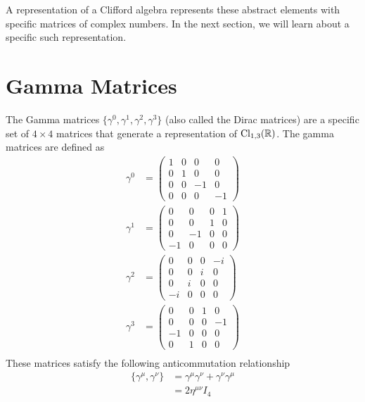 \documentclass[book.tex]{subfiles}
\begin{document}
A representation of a Clifford algebra represents these abstract elements with specific matrices of complex numbers. In the next section, we will learn about a specific such representation.

\section{Gamma Matrices}

The Gamma matrices $\{\gamma^0, \gamma^1, \gamma^2, \gamma^3\}$ (also called the Dirac matrices) are a specific set of $4 \times 4$ matrices that generate a representation of $\rm{Cl}_{1,3}(\mathbb{R})$. The gamma matrices are defined as
\begin{align}
    \gamma^0 &= \begin{pmatrix}
    1 & 0 & 0 & 0 \\
    0 & 1 & 0 & 0 \\
    0 & 0 & -1 & 0 \\
    0 & 0 & 0 & -1 
    \end{pmatrix} \\
    \gamma^1 &= \begin{pmatrix}
    0 & 0 & 0 & 1 \\
    0 & 0 & 1 & 0 \\
    0 & -1 & 0 & 0 \\
    -1 & 0 & 0 & 0 
    \end{pmatrix} \\
    \gamma^2 &= \begin{pmatrix}
    0 & 0 & 0 & -i \\
    0 & 0 & i & 0 \\
    0 & i & 0 & 0 \\
    -i & 0 & 0 & 0 
    \end{pmatrix} \\
    \gamma^3 &= \begin{pmatrix}
    0 & 0 & 1 & 0 \\
    0 & 0 & 0 & -1 \\
    -1 & 0 & 0 & 0 \\
    0 & 1 & 0 & 0 
    \end{pmatrix} \\
\end{align}
These matrices satisfy the following anticommutation relationship
\begin{align}
    \{\gamma^\mu, \gamma^\nu\} &= \gamma^{\mu} \gamma^\nu + \gamma^\nu \gamma^\mu \\
    &= 2 \eta^{\mu\nu} I_4
\end{align}
\end{document}
